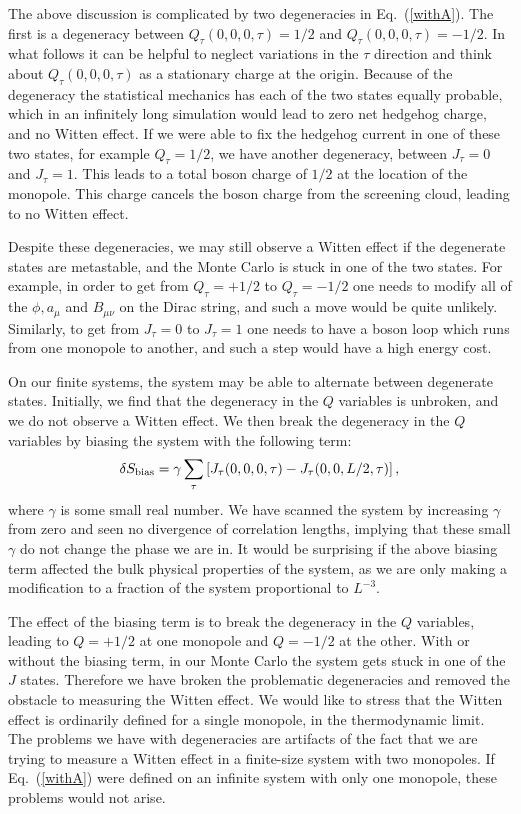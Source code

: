 \documentclass[prb,twocolumn]{revtex4-1}
\begin{document}
The above discussion is complicated by two degeneracies in Eq.~(\ref{withA}). The first is a degeneracy between $Q_\tau(0,0,0,\tau)=1/2$ and $Q_\tau(0,0,0,\tau)=-1/2$. In what follows it can be helpful to neglect variations in the $\tau$ direction and think about $Q_\tau(0,0,0,\tau)$ as a stationary charge at the origin. Because of the degeneracy the statistical mechanics has each of the two states equally probable, which in an infinitely long simulation would lead to zero net hedgehog charge, and no Witten effect.
If we were able to fix the hedgehog current in one of these two states, for example $Q_\tau=1/2$, we have another degeneracy, between $J_\tau=0$ and $J_\tau=1$. This leads to a total boson charge of $1/2$ at the location of the  monopole. This charge cancels the boson charge from the screening cloud, leading to no Witten effect. 

Despite these degeneracies, we may still observe a Witten effect if the degenerate states are metastable, and the Monte Carlo is stuck in one of the two states. For example, in order to get from $Q_\tau=+1/2$ to $Q_\tau=-1/2$ one needs to modify all of the $\phi, a_\mu$ and $B_{\mu\nu}$ on the Dirac string, and such a move would be quite unlikely. Similarly, to get from $J_\tau=0$ to $J_\tau=1$ one needs to have a boson loop which runs from one monopole to another, and such a step would have a high energy cost. 

On our finite systems, the system may be able to alternate between degenerate states. Initially, we find that the degeneracy in the $Q$ variables is unbroken, and we do not observe a Witten effect. We then break the degeneracy in the $Q$ variables by biasing the system with the following term:
\begin{equation}
\delta S_{\rm bias}=\gamma  \sum_{\tau}\left[J_\tau(0,0,0,\tau)-J_\tau(0,0,L/2,\tau)\right],
\label{bias}
\end{equation}
where $\gamma$ is some small real number. We have scanned the system by increasing $\gamma$ from zero and seen no divergence of correlation lengths, implying that these small $\gamma$ do not change the phase we are in. It would be surprising if the above biasing term affected the bulk physical properties of the system, as we are only making a modification to a fraction of the system proportional to $L^{-3}$. 

The effect of the biasing term is to break the degeneracy in the $Q$ variables, leading to $Q=+1/2$ at one monopole and $Q=-1/2$ at the other. With or without the biasing term, in our Monte Carlo the system gets stuck in one of the $J$ states. Therefore we have broken the problematic degeneracies and removed the obstacle to measuring the Witten effect. We would like to stress that the Witten effect is ordinarily defined for a single monopole, in the thermodynamic limit. The problems we have with degeneracies are artifacts of the fact that we are trying to measure a Witten effect in a finite-size system with two monopoles. If Eq.~(\ref{withA}) were defined on an infinite system with only one monopole, these problems would not arise.
\end{document}
